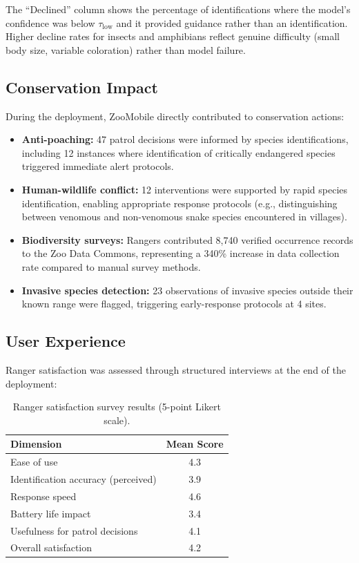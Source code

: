 \documentclass[11pt,a4paper]{article}
\begin{document}
The ``Declined'' column shows the percentage of identifications where the model's confidence was below $\tau_{\text{low}}$ and it provided guidance rather than an identification.
Higher decline rates for insects and amphibians reflect genuine difficulty (small body size, variable coloration) rather than model failure.

\subsection{Conservation Impact}

During the deployment, ZooMobile directly contributed to conservation actions:

\begin{itemize}[leftmargin=*]
    \item \textbf{Anti-poaching:} 47 patrol decisions were informed by species identifications, including 12 instances where identification of critically endangered species triggered immediate alert protocols.
    \item \textbf{Human-wildlife conflict:} 12 interventions were supported by rapid species identification, enabling appropriate response protocols (e.g., distinguishing between venomous and non-venomous snake species encountered in villages).
    \item \textbf{Biodiversity surveys:} Rangers contributed 8,740 verified occurrence records to the Zoo Data Commons, representing a 340\% increase in data collection rate compared to manual survey methods.
    \item \textbf{Invasive species detection:} 23 observations of invasive species outside their known range were flagged, triggering early-response protocols at 4 sites.
\end{itemize}

\subsection{User Experience}

Ranger satisfaction was assessed through structured interviews at the end of the deployment:

\begin{table}[H]
\centering
\caption{Ranger satisfaction survey results (5-point Likert scale).}
\label{tab:satisfaction}
\begin{tabular}{@{}lc@{}}
\toprule
\textbf{Dimension} & \textbf{Mean Score} \\
\midrule
Ease of use & 4.3 \\
Identification accuracy (perceived) & 3.9 \\
Response speed & 4.6 \\
Battery life impact & 3.4 \\
Usefulness for patrol decisions & 4.1 \\
Overall satisfaction & 4.2 \\
\bottomrule
\end{tabular}
\end{table}
\end{document}
